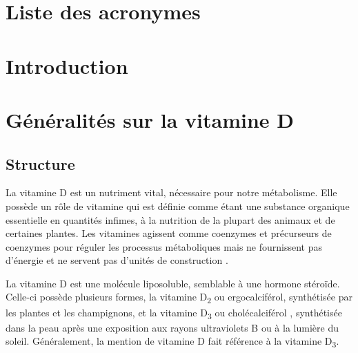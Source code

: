 \documentclass[
  a4paper,
  DIV=11,
  numbers=noendperiod,
  listof=totoc]{scrreprt}
\begin{document}
\newpage{}

\hypertarget{liste-des-acronymes}{%
\chapter*{Liste des acronymes}\label{liste-des-acronymes}}

\begin{acronym}
\end{acronym}

\newpage{}

\hypertarget{introduction}{%
\chapter{Introduction}\label{introduction}}


\newpage{}

\hypertarget{guxe9nuxe9ralituxe9s-sur-la-vitamine-d}{%
\chapter{Généralités sur la vitamine
D}\label{guxe9nuxe9ralituxe9s-sur-la-vitamine-d}}

\hypertarget{structure}{%
\section{Structure}\label{structure}}

La vitamine D est un nutriment vital, nécessaire pour notre métabolisme.
Elle possède un rôle de vitamine qui est définie comme étant une
substance organique essentielle en quantités infimes, à la nutrition de
la plupart des animaux et de certaines plantes. Les vitamines agissent
comme coenzymes et précurseurs de coenzymes pour réguler les processus
métaboliques mais ne fournissent pas d'énergie et ne servent pas
d'unités de construction \autocite{Ellison.2020}.

La vitamine D est une molécule liposoluble, semblable à une hormone
stéroïde. Celle-ci possède plusieurs formes, la vitamine
D\textsubscript{2} ou ergocalciférol, synthétisée par les plantes et les
champignons, et la vitamine D\textsubscript{3} ou cholécalciférol ,
synthétisée dans la peau après une exposition aux rayons ultraviolets B
ou à la lumière du soleil. Généralement, la mention de vitamine D fait
référence à la vitamine D\textsubscript{3}.
\end{document}
